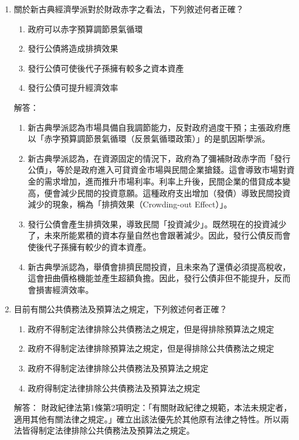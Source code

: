 \documentclass[12pt, a4paper]{article}
\begin{document}
\begin{enumerate}
    \item 關於新古典經濟學派對於財政赤字之看法，下列敘述何者正確？
    \begin{enumerate}[label=\Alph*.]
        \item 政府可以赤字預算調節景氣循環
        \item 發行公債將造成排擠效果
        \item 發行公債可使後代子孫擁有較多之資本資產
        \item 發行公債可提升經濟效率
    \end{enumerate}
    解答：
    \begin{enumerate}[label=\Alph*.]
        \item 新古典學派認為市場具備自我調節能力，反對政府過度干預；主張政府應以「赤字預算調節景氣循環（反景氣循環政策）」的是凱因斯學派。
        \item 新古典學派認為，在資源固定的情況下，政府為了彌補財政赤字而「發行公債」，等於是政府進入可貸資金市場與民間企業搶錢。這會導致市場對資金的需求增加，進而推升市場利率。利率上升後，民間企業的借貸成本變高，便會減少民間的投資意願。這種政府支出增加（發債）導致民間投資減少的現象，稱為「排擠效果（Crowding-out Effect）」。
        \item 發行公債會產生排擠效果，導致民間「投資減少」。既然現在的投資減少了，未來所能累積的資本存量自然也會跟著減少。因此，發行公債反而會使後代子孫擁有較少的資本資產。
        \item 新古典學派認為，舉債會排擠民間投資，且未來為了還債必須提高稅收，這會扭曲價格機能並產生超額負擔。因此，發行公債非但不能提升，反而會損害經濟效率。
    \end{enumerate}

    \item 目前有關公共債務法及預算法之規定，下列敘述何者正確？
    \begin{enumerate}[label=\Alph*.]
        \item 政府不得制定法律排除公共債務法之規定，但是得排除預算法之規定
        \item 政府不得制定法律排除預算法之規定，但是得排除公共債務法之規定
        \item 政府不得制定法律排除公共債務法及預算法之規定
        \item 政府得制定法律排除公共債務法及預算法之規定
    \end{enumerate}
    解答：
    財政紀律法第1條第2項明定：「有關財政紀律之規範，本法未規定者，適用其他有關法律之規定。」確立出該法優先於其他原有法律之特性。所以兩法皆得制定法律排除公共債務法及預算法之規定。


\end{enumerate}
\end{document}
